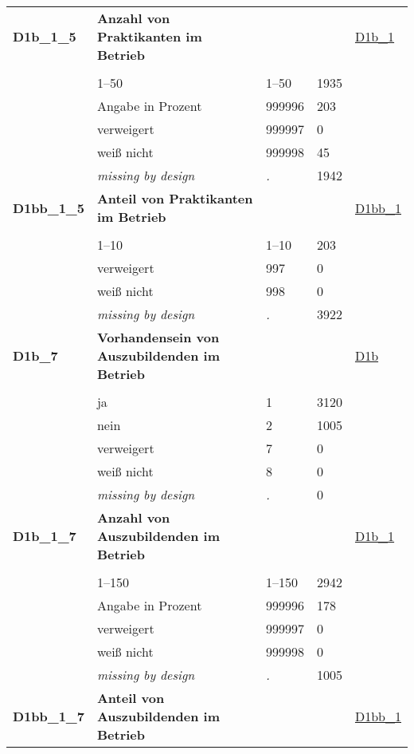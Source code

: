 \begin{longtable}{| L{2.65cm} | L{8cm} | C{1.5cm} | R{1.25cm} | C{2.25cm}  |}
   \midrule
\textbf{D1b\_1\_5}\label{var:D1b:1:5} & \textbf{Anzahl von Praktikanten im Betrieb} &  &  & \hyperref[D1b:1]{D1b\_1} \\ 
   &  &  &  &  \\ 
   & 1--50 & 1--50 & 1935 &  \\ 
   & Angabe in Prozent & 999996 & 203 &  \\ 
   & verweigert & 999997 & 0 &  \\ 
   & weiß nicht & 999998 & 45 &  \\ 
   & \textit{missing by design} & \textit{.} & 1942 &  \\ 
   \midrule
\textbf{D1bb\_1\_5}\label{var:D1bb:1:5} & \textbf{Anteil von Praktikanten im Betrieb} &  &  & \hyperref[D1bb:1]{D1bb\_1} \\ 
   &  &  &  &  \\ 
   & 1--10 & 1--10 & 203 &  \\ 
   & verweigert & 997 & 0 &  \\ 
   & weiß nicht & 998 & 0 &  \\ 
   & \textit{missing by design} & \textit{.} & 3922 &  \\ 
   \midrule
\textbf{D1b\_7}\label{var:D1b:7} & \textbf{Vorhandensein von Auszubildenden im Betrieb} &  &  & \hyperref[D1b]{D1b} \\ 
   &  &  &  &  \\ 
   & ja & 1 & 3120 &  \\ 
   & nein & 2 & 1005 &  \\ 
   & verweigert & 7 & 0 &  \\ 
   & weiß nicht & 8 & 0 &  \\ 
   & \textit{missing by design} & \textit{.} & 0 &  \\ 
   \midrule
\textbf{D1b\_1\_7}\label{var:D1b:1:7} & \textbf{Anzahl von Auszubildenden im Betrieb} &  &  & \hyperref[D1b:1]{D1b\_1} \\ 
   &  &  &  &  \\ 
   & 1--150 & 1--150 & 2942 &  \\ 
   & Angabe in Prozent & 999996 & 178 &  \\ 
   & verweigert & 999997 & 0 &  \\ 
   & weiß nicht & 999998 & 0 &  \\ 
   & \textit{missing by design} & \textit{.} & 1005 &  \\ 
   \midrule
\textbf{D1bb\_1\_7}\label{var:D1bb:1:7} & \textbf{Anteil von Auszubildenden im Betrieb} &  &  & \hyperref[D1bb:1]{D1bb\_1} \\ 

\end{longtable}
